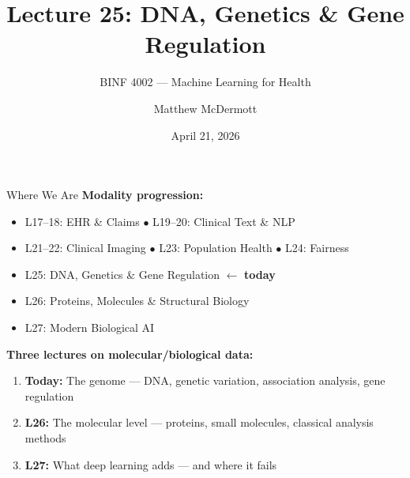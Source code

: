 \documentclass[aspectratio=169,10pt]{beamer}
\title{Lecture 25: DNA, Genetics \& Gene Regulation}
\subtitle{BINF 4002 --- Machine Learning for Health}
\author{Matthew McDermott}
\institute{Dept.\ of Biomedical Informatics, Columbia University}
\date{April 21, 2026}
\begin{document}
\begin{frame}[noframenumbering]
\maketitle
\end{frame}

\begin{frame}{Where We Are}
\textbf{Modality progression:}
\begin{itemize}
    \item[\textcolor{columbiagray}{$\bullet$}] L17--18: EHR \& Claims \quad\textcolor{columbiagray}{$\bullet$} L19--20: Clinical Text \& NLP
    \item[\textcolor{columbiagray}{$\bullet$}] L21--22: Clinical Imaging \quad\textcolor{columbiagray}{$\bullet$} L23: Population Health \quad\textcolor{columbiagray}{$\bullet$} L24: Fairness
    \item[\textcolor{columbiaaccent}{$\to$}] \alert{L25: DNA, Genetics \& Gene Regulation} $\gets$ \textbf{today}
    \item[\textcolor{columbiagray}{$\circ$}] L26: Proteins, Molecules \& Structural Biology
    \item[\textcolor{columbiagray}{$\circ$}] L27: Modern Biological AI
\end{itemize}

\vspace{0.3em}
\textbf{Three lectures on molecular/biological data:}
\begin{enumerate}[<+->]
    \item \textbf{Today:} The genome --- DNA, genetic variation, association analysis, gene regulation
    \item \textbf{L26:} The molecular level --- proteins, small molecules, classical analysis methods
    \item \textbf{L27:} What deep learning adds --- and where it fails
\end{enumerate}
\end{frame}
\end{document}
